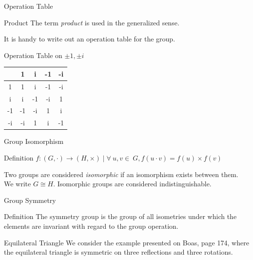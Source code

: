 \documentclass{beamer}
\begin{document}
\begin{frame}{Operation Table}
    \begin{block}{Product}
        The term \emph{product} is used in the generalized sense.
    \end{block}
    It is handy to write out an operation table for the group.
    \begin{exampleblock}{Operation Table on $\pm 1, \pm i$}
        \begin{center}
            \begin{tabular}{c|cccc}
                & 1 & i & -1 & -i \\
                \hline
                1 & 1 & i & -1 & -i \\
                i & i & -1 & -i & 1 \\
                -1 & -1 & -i & 1 & i \\
                -i & -i & 1 & i & -1
            \end{tabular}
        \end{center}
    \end{exampleblock}
\end{frame}

\begin{frame}{Group Isomorphism}
    \begin{block}{Definition}
        $f: (G,\cdot)\rightarrow (H,\times) \mid \forall\ u, v \in\ G, f(u\cdot v) = f(u)\times f(v)$
    \end{block}
    Two groups are considered \emph{isomorphic} if an isomorphism exists between them.  We write $G\cong H$.  Isomorphic groups are considered indistinguishable.
\end{frame}

\begin{frame}{Group Symmetry}
    \begin{block}{Definition}
        The symmetry group is the group of all isometries under which the elements are invariant with regard to the group operation.
    \end{block}
    \begin{exampleblock}{Equilateral Triangle}
        We consider the example presented on Boas, page 174, where the equilateral triangle is symmetric on three reflections and three rotations.
    \end{exampleblock}
\end{frame}
\end{document}

